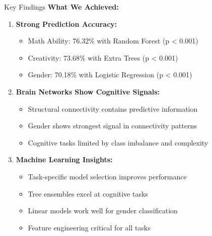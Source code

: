 \documentclass{beamer}
\begin{document}
\begin{frame}{Key Findings}
\textbf{What We Achieved:}

\begin{enumerate}
  \item \textbf{Strong Prediction Accuracy:}
  \begin{itemize}
    \item Math Ability: 76.32\% with Random Forest (p < 0.001)
    \item Creativity: 73.68\% with Extra Trees (p < 0.001)
    \item Gender: 70.18\% with Logistic Regression (p < 0.001)
  \end{itemize}
  
  \vspace{0.3cm}
  
  \item \textbf{Brain Networks Show Cognitive Signals:}
  \begin{itemize}
    \item Structural connectivity contains predictive information
    \item Gender shows strongest signal in connectivity patterns
    \item Cognitive tasks limited by class imbalance and complexity
  \end{itemize}
  
  \vspace{0.3cm}
  
  \item \textbf{Machine Learning Insights:}
  \begin{itemize}
    \item Task-specific model selection improves performance
    \item Tree ensembles excel at cognitive tasks
    \item Linear models work well for gender classification
    \item Feature engineering critical for all tasks
  \end{itemize}
\end{enumerate}
\end{frame}
\end{document}
